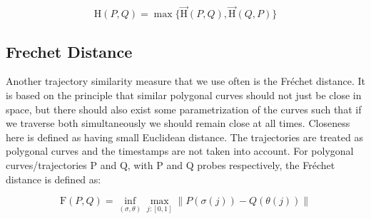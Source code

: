 \documentclass[twoside,12pt, a4paper]{report}
\begin{document}
$$\mathrm{H}(P, Q)=\max \{\overrightarrow{\mathrm{H}}(P, Q), \overrightarrow{\mathrm{H}}(Q, P)\} $$


\subsection{Frechet Distance}

 \cite{kerkhof2022algorithmic}
Another trajectory similarity measure that we use often is the Fréchet distance. It
is based on the principle that similar polygonal curves should not just be close in
space, but there should also exist some parametrization of the curves such that if
we traverse both simultaneously we should remain close at all times. Closeness
here is defined as having small Euclidean distance. The trajectories are treated as
polygonal curves and the timestamps are not taken into account. For polygonal
curves/trajectories P and Q, with P and Q probes respectively, the Fréchet distance
is defined as:

$$\mathrm{F}(P, Q)=\inf _{(\sigma, \theta)} \max _{j:[0,1]}\|P(\sigma(j))-Q(\theta(j))\| $$
\end{document}
